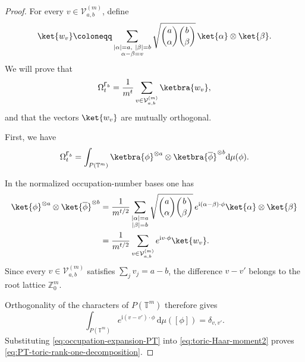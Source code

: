 \documentclass[aps,twocolumn,pra,superscriptaddress,nofootinbib]{revtex4-2}
\begin{document}
\begin{proof}

For every $v\in\mathcal{V}_{a,b}^{(m)}$, define
    \begin{equation}
        \ket{w_v}
        \coloneqq
        \sum_{\substack{|\alpha|=a,\ |\beta|=b\\
                        \alpha-\beta=v}}
        \sqrt{
            \binom{a}{\alpha}
            \binom{b}{\beta}
        }\,
        \ket{\alpha}\otimes\ket{\beta}.
        \label{eq:wv-definition}
    \end{equation}
    We will prove that
    \begin{equation}
        \Omega_t^{\mathsf{\Gamma}_b}
        =
        \frac{1}{m^t}
        \sum_{v\in\mathcal{V}_{a,b}^{(m)}}
        \ketbra{w_v},
        \label{eq:PT-toric-rank-one-decomposition}
    \end{equation}
    and that the vectors $\ket{w_v}$ are mutually orthogonal.

    First, we have
\begin{equation}
    \Omega_{t}^{\mathsf{\Gamma}_{b}}
    =
    \int_{P(\mathbb{T}^{m})}\ketbra{\phi}
    ^{\otimes a}\otimes\ketbra{\overline{\phi}}
    ^{\otimes b}
    \mathrm{d}\mu(\phi).
    \label{eq:toric-Haar-moment2}
\end{equation}


    
    In the normalized occupation-number bases one has
    \begin{align}
        \ket{\phi}^{\otimes a}
        \otimes
        \ket{\overline{\phi}}^{\otimes b}
        &=
        \frac{1}{m^{t/2}}
        \sum_{\substack{|\alpha|=a\\|\beta|=b}}
        \sqrt{
            \binom{a}{\alpha}
            \binom{b}{\beta}
        }\,
        e^{\mathrm{i}(\alpha-\beta)\cdot\phi}
        \ket{\alpha}\otimes\ket{\beta}
        \nonumber\\
        &=
        \frac{1}{m^{t/2}}
        \sum_{v\in\mathcal{V}_{a,b}^{(m)}}
        e^{\mathrm{i}v\cdot\phi}\ket{w_v}.
        \label{eq:occupation-expansion-PT}
    \end{align}
    Since every $v\in\mathcal{V}_{a,b}^{(m)}$ satisfies
    $\sum_jv_j=a-b$, the difference $v-v'$ belongs to the root lattice
    $\mathbb{Z}_{0}^{m}$.
   
    Orthogonality of the characters of $P(\mathbb{T}^{m})$ therefore gives
    \begin{equation}
        \int_{P(\mathbb{T}^{m})}
        e^{\mathrm{i}(v-v')\cdot\phi}
        \,\mathrm{d}\mu([\phi])
        =
        \delta_{v,v'}.
    \end{equation}
    Substituting \eqref{eq:occupation-expansion-PT} into
    \eqref{eq:toric-Haar-moment2} proves
    \eqref{eq:PT-toric-rank-one-decomposition}.


\end{proof}
\end{document}
